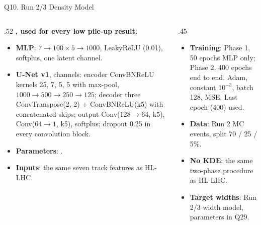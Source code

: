 \begin{frame}{Q10. Run 2/3 Density Model}
\footnotesize
\begin{columns}[T]
\begin{column}{.52\linewidth}
\textbf{\lpModel{}, used for every low pile-up result.}
\begin{itemize}\setlength\itemsep{.25em}
\item \textbf{MLP}: $7\to100\times5\to1000$, LeakyReLU (0.01), softplus, one latent channel.
\item \textbf{U-Net v1}, \lpUnetCh{} channels: encoder ConvBNReLU kernels 25, 7, 5, 5 with max-pool, $1000\to500\to250\to125$; decoder three ConvTranspose(2, 2) + ConvBNReLU(k5) with concatenated skips; output Conv($128\to64$, k5), Conv($64\to1$, k5), softplus; dropout 0.25 in every convolution block.
\item \textbf{Parameters}: \lpParams.
\item \textbf{Inputs}: the same seven track features as HL-LHC.
\end{itemize}
\end{column}
\begin{column}{.45\linewidth}
\begin{itemize}\setlength\itemsep{.25em}
\item \textbf{Training}: Phase 1, 50 epochs MLP only; Phase 2, 400 epochs end to end. Adam, constant $10^{-3}$, batch 128, MSE. Last epoch (400) used.
\item \textbf{Data}: \lpMCTotal{} Run 2 MC events, split 70 / 25 / 5\%.
\item \textbf{No KDE}: the same two-phase procedure as HL-LHC.
\item \textbf{Target widths}: Run 2/3 width model, parameters in Q29.
\end{itemize}
\end{column}
\end{columns}
\end{frame}

